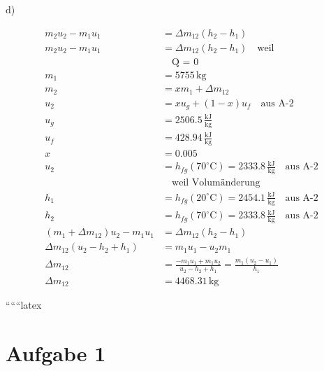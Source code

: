 d)

\begin{align*}
    m_2 u_2 - m_1 u_1 &= \Delta m_{12} (h_2 - h_1) \\
    m_2 u_2 - m_1 u_1 &= \Delta m_{12} (h_2 - h_1) \quad \text{weil} \\
    &\quad \text{Q = 0} \\
    m_1 &= 5755 \, \text{kg} \\
    m_2 &= x m_1 + \Delta m_{12} \\
    u_2 &= x u_g + (1 - x) u_f \quad \text{aus A-2} \\
    u_g &= 2506.5 \, \frac{\text{kJ}}{\text{kg}} \\
    u_f &= 428.94 \, \frac{\text{kJ}}{\text{kg}} \\
    x &= 0.005 \\
    u_2 &= h_{fg} (70^\circ \text{C}) = 2333.8 \, \frac{\text{kJ}}{\text{kg}} \quad \text{aus A-2} \\
    &\quad \text{weil Volumänderung} \\
    h_1 &= h_{fg} (20^\circ \text{C}) = 2454.1 \, \frac{\text{kJ}}{\text{kg}} \quad \text{aus A-2} \\
    h_2 &= h_{fg} (70^\circ \text{C}) = 2333.8 \, \frac{\text{kJ}}{\text{kg}} \quad \text{aus A-2} \\
    (m_1 + \Delta m_{12}) u_2 - m_1 u_1 &= \Delta m_{12} (h_2 - h_1) \\
    \Delta m_{12} (u_2 - h_2 + h_1) &= m_1 u_1 - u_2 m_1 \\
    \Delta m_{12} &= \frac{-m_1 u_1 + m_1 u_2}{u_2 - h_2 + h_1} = \frac{m_1 (u_2 - u_1)}{h_1} \\
    \Delta m_{12} &= 4468.31 \, \text{kg}
\end{align*}

``````latex


\section*{Aufgabe 1}